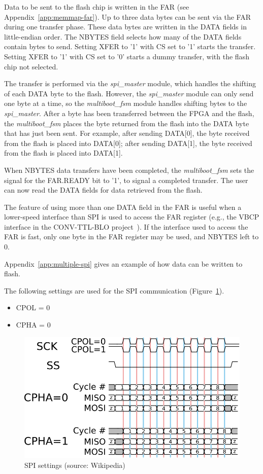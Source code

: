 \documentclass[a4paper,11pt]{article}
\begin{document}
Data to be sent to the flash chip is written in the FAR (see Appendix~\ref{app:memmap-far}).
Up to three data bytes can be sent via the FAR during one transfer phase. These data
bytes are written in the DATA fields in little-endian order. The NBYTES field selects
how many of the DATA fields contain bytes to send. Setting XFER to '1' with CS set to
'1' starts the transfer. Setting XFER to '1' with CS set to '0' starts a dummy
transfer, with the flash chip not selected.

The transfer is performed via the \textit{spi\_master} module, which handles the
shifting of each DATA byte to the flash. However, the \textit{spi\_master} module
can only send one byte at a time, so the \textit{multiboot\_fsm} module handles
shifting bytes to the \textit{spi\_master}. After a byte has been transferred
between the FPGA and the flash, the \textit{multiboot\_fsm} places the byte
returned from the flash into the DATA byte that has just been sent. For example,
after sending DATA[0], the byte received from the flash is placed into DATA[0];
after sending DATA[1], the byte received from the flash is placed into DATA[1].

When NBYTES data transfers have been completed, the \textit{multiboot\_fsm} sets
the signal for the FAR.READY bit to '1', to signal a completed transfer. The user
can now read the DATA fields for data retrieved from the flash.

The feature of using more than one DATA field in the FAR is useful when a lower-speed
interface than SPI is used to access the FAR register (e.g., the VBCP interface in
the CONV-TTL-BLO project~\cite{ctb-proj}). If the interface used to access the FAR
is fast, only one byte in the FAR register may be used, and NBYTES left to 0.

Appendix~\ref{app:multiple-spi} gives an example of how data can be written to flash.

The following settings are used for the SPI communication (Figure~\ref{fig:spi-mode}).
\begin{itemize}
  \item CPOL = 0
  \item CPHA = 0
\end{itemize}

\begin{figure}[h]
  \centerline{\includegraphics[width=.7\textwidth]{fig/spi-mode}}
  \caption{SPI settings (source: Wikipedia)}
  \label{fig:spi-mode}
\end{figure}
\end{document}
